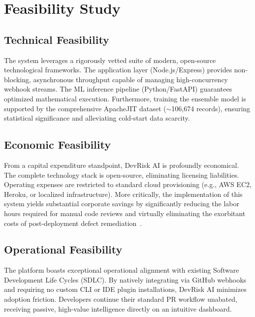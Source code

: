 \documentclass[12pt, a4paper]{article}
\begin{document}
\clearpage
\section{Feasibility Study}

\subsection{Technical Feasibility}
The system leverages a rigorously vetted suite of modern, open-source technological frameworks. The application layer (Node.js/Express) provides non-blocking, asynchronous throughput capable of managing high-concurrency webhook streams. The ML inference pipeline (Python/FastAPI) guarantees optimized mathematical execution. Furthermore, training the ensemble model is supported by the comprehensive ApacheJIT dataset ($\sim$106,674 records), ensuring statistical significance and alleviating cold-start data scarcity.

\subsection{Economic Feasibility}
From a capital expenditure standpoint, DevRisk AI is profoundly economical. The complete technology stack is open-source, eliminating licensing liabilities. Operating expenses are restricted to standard cloud provisioning (e.g., AWS EC2, Heroku, or localized infrastructure). More critically, the implementation of this system yields substantial corporate savings by significantly reducing the labor hours required for manual code reviews and virtually eliminating the exorbitant costs of post-deployment defect remediation~\cite{boehm2001}.

\subsection{Operational Feasibility}
The platform boasts exceptional operational alignment with existing Software Development Life Cycles (SDLC). By natively integrating via GitHub webhooks and requiring no custom CLI or IDE plugin installations, DevRisk AI minimizes adoption friction. Developers continue their standard PR workflow unabated, receiving passive, high-value intelligence directly on an intuitive dashboard. 
\end{document}
